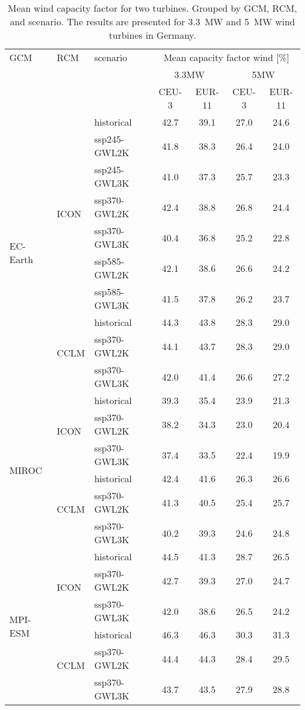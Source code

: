 \begin{table}[!htbp]
\centering
\caption{Mean wind capacity factor for two turbines. Grouped by GCM, RCM, and scenario. The results are presented for \qty{3.3}{\mega\watt} and \qty{5}{\mega\watt} wind turbines in Germany.}
\label{Table:CF_Wind_changes}
\begin{tabular}{lll|cc|cc}
\toprule
GCM & RCM & scenario & \multicolumn{4}{c}{Mean capacity factor wind [\%]} \\
 & & & \multicolumn{2}{c}{3.3\si{\mega\watt}} & \multicolumn{2}{c}{5\si{\mega\watt}} \\
 & & & CEU-3 & EUR-11 & CEU-3 & EUR-11 \\
\midrule
\cmidrule(lr){1-7}
\multirow{10}{*}{EC-Earth} & \multirow{7}{*}{ICON} & historical & 42.7 & 39.1 & 27.0 & 24.6 \\
 &  & ssp245-GWL2K & 41.8 & 38.3 & 26.4 & 24.0 \\
 &  & ssp245-GWL3K & 41.0 & 37.3 & 25.7 & 23.3 \\
 &  & ssp370-GWL2K & 42.4 & 38.8 & 26.8 & 24.4 \\
 &  & ssp370-GWL3K & 40.4 & 36.8 & 25.2 & 22.8 \\
 &  & ssp585-GWL2K & 42.1 & 38.6 & 26.6 & 24.2 \\
 &  & ssp585-GWL3K & 41.5 & 37.8 & 26.2 & 23.7 \\
\cmidrule(lr){2-7}
 & \multirow{3}{*}{CCLM} & historical & 44.3 & 43.8 & 28.3 & 29.0 \\
 &  & ssp370-GWL2K & 44.1 & 43.7 & 28.3 & 29.0 \\
 &  & ssp370-GWL3K & 42.0 & 41.4 & 26.6 & 27.2 \\
\cmidrule(lr){2-7}
\multirow{6}{*}{MIROC} & \multirow{3}{*}{ICON} & historical & 39.3 & 35.4 & 23.9 & 21.3 \\
 &  & ssp370-GWL2K & 38.2 & 34.3 & 23.0 & 20.4 \\
 &  & ssp370-GWL3K & 37.4 & 33.5 & 22.4 & 19.9 \\
\cmidrule(lr){2-7}
 & \multirow{3}{*}{CCLM} & historical & 42.4 & 41.6 & 26.3 & 26.6 \\
 &  & ssp370-GWL2K & 41.3 & 40.5 & 25.4 & 25.7 \\
 &  & ssp370-GWL3K & 40.2 & 39.3 & 24.6 & 24.8 \\
\cmidrule(lr){2-7}
\multirow{6}{*}{MPI-ESM} & \multirow{3}{*}{ICON} & historical & 44.5 & 41.3 & 28.7 & 26.5 \\
 &  & ssp370-GWL2K & 42.7 & 39.3 & 27.0 & 24.7 \\
 &  & ssp370-GWL3K & 42.0 & 38.6 & 26.5 & 24.2 \\
\cmidrule(lr){2-7}
 & \multirow{3}{*}{CCLM} & historical & 46.3 & 46.3 & 30.3 & 31.3 \\
 &  & ssp370-GWL2K & 44.4 & 44.3 & 28.4 & 29.5 \\
 &  & ssp370-GWL3K & 43.7 & 43.5 & 27.9 & 28.8 \\
\bottomrule
\end{tabular}
\end{table}
